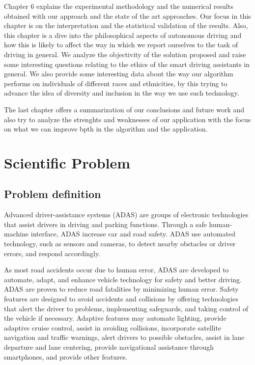 \documentclass[runningheads,a4paper,11pt]{report}
\begin{document}
Chapter 6 explains the experimental methodology and the numerical results obtained with our approach and the state of the art approaches. Our focus in this chapter is on the interpretation and the statistical validation of the results. Also, this chapter is a dive into the philosophical aspects of autonomous driving and how this is likely to affect the way in which we report ourselves to the task of driving in general. We analyze the objectivity of the solution proposed and raise some interesting questions relating to the ethics of the smart driving assistants in general. We also provide some interesting data about the way our algorithm performs on individuals of different races and ethnicities, by this trying to advance the idea of diversity and inclusion in the way we use such technology.

The last chapter offers a summarization of our conclusions and future work and also try to analyze the strenghts and weaknesses of our application with the focus on what we can improve bpth in the algorithm and the application.

\chapter{Scientific Problem}
\label{section:scientificProblem}


\section{Problem definition}
\label{section:problemDefinition}


Advanced driver-assistance systems (ADAS) are groups of electronic technologies that assist drivers in driving and parking functions. Through a safe human-machine interface, ADAS increase car and road safety. ADAS use automated technology, such as sensors and cameras, to detect nearby obstacles or driver errors, and respond accordingly.

As most road accidents occur due to human error, ADAS are developed to automate, adapt, and enhance vehicle technology for safety and better driving. ADAS are proven to reduce road fatalities by minimizing human error. Safety features are designed to avoid accidents and collisions by offering technologies that alert the driver to problems, implementing safeguards, and taking control of the vehicle if necessary. Adaptive features may automate lighting, provide adaptive cruise control, assist in avoiding collisions, incorporate satellite navigation and traffic warnings, alert drivers to possible obstacles, assist in lane departure and lane centering, provide navigational assistance through smartphones, and provide other features.
\end{document}

